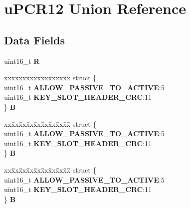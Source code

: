 \hypertarget{unionuPCR12}{}\section{u\+P\+C\+R12 Union Reference}
\label{unionuPCR12}
\subsection*{Data Fields}
\begin{DoxyCompactItemize}
\item 
\mbox{\label{unionuPCR12_a7ffe97c169ed764acf8b250a72649df8}} 
uint16\+\_\+t {\bfseries R}
\item 
\mbox{\label{unionuPCR12_a046c8fba46a443526325d1b694d62f9b}} 
\begin{tabbing}
xx\=xx\=xx\=xx\=xx\=xx\=xx\=xx\=xx\=\kill
struct \{\\
\>uint16\_t {\bfseries ALLOW\_PASSIVE\_TO\_ACTIVE}:5\\
\>uint16\_t {\bfseries KEY\_SLOT\_HEADER\_CRC}:11\\
\} {\bfseries B}\\

\end{tabbing}\item 
\mbox{\label{unionuPCR12_afd2de6eca59badf4c8416076c966352e}} 
\begin{tabbing}
xx\=xx\=xx\=xx\=xx\=xx\=xx\=xx\=xx\=\kill
struct \{\\
\>uint16\_t {\bfseries ALLOW\_PASSIVE\_TO\_ACTIVE}:5\\
\>uint16\_t {\bfseries KEY\_SLOT\_HEADER\_CRC}:11\\
\} {\bfseries B}\\

\end{tabbing}\item 
\mbox{\label{unionuPCR12_aaeb596e1ef7eab410913711f850608aa}} 
\begin{tabbing}
xx\=xx\=xx\=xx\=xx\=xx\=xx\=xx\=xx\=\kill
struct \{\\
\>uint16\_t {\bfseries ALLOW\_PASSIVE\_TO\_ACTIVE}:5\\
\>uint16\_t {\bfseries KEY\_SLOT\_HEADER\_CRC}:11\\
\} {\bfseries B}\\


\end{tabbing}
\end{DoxyCompactItemize}
